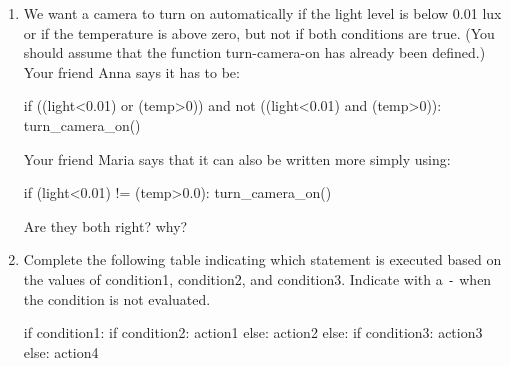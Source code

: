\begin{enumerate}

\item We want a camera to turn on automatically if the light level is below 0.01 lux or if the temperature is above zero, but not if both conditions are true. (You should assume that the function turn-camera-on has already been defined.) Your friend Anna says it has to be:


\begin{python}
if ((light<0.01) or (temp>0)) and  not ((light<0.01) and (temp>0)):
	turn_camera_on()
\end{python}

Your friend Maria says that it can also be written more simply using:

\begin{python}
if (light<0.01) != (temp>0.0):
	turn_camera_on()
\end{python}

Are they both right? why?




\item Complete the following table indicating which statement is executed based on the values of condition1, condition2, and condition3. Indicate with a \verb|-| when the condition is not evaluated.

\begin{python}
if condition1:
    if condition2:
        action1
    else:
        action2
else:
    if condition3:
        action3
    else:
        action4
\end{python}



\end{enumerate}

